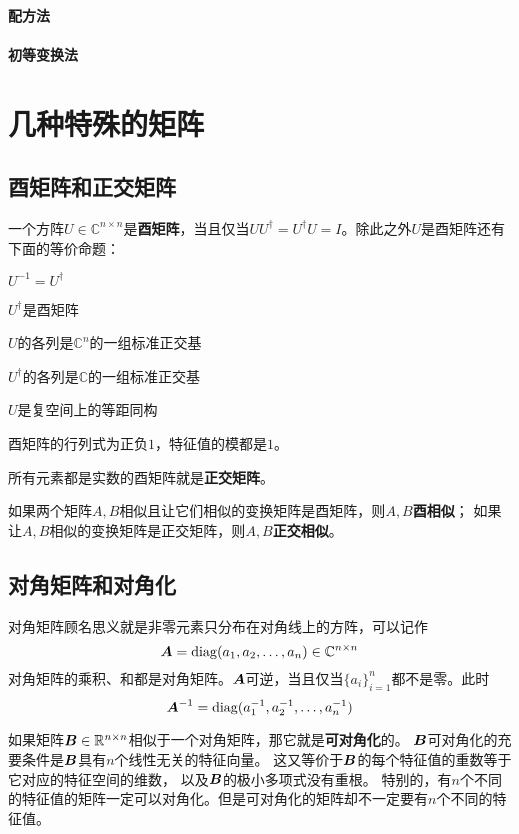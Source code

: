 \documentclass[UTF8]{ctexart}
\newcommand*{\reals}{\mathbb{R}}
\renewcommand*{\reals}{\mathbb{R}}
\newcommand*{\complexes}{\mathbb{C}}
\DeclareMathOperator{\diag}{diag}
\theoremstyle{definition}
\renewenvironment{itemize}{\begin{compactitem}}{\end{compactitem}}
\begin{document}
\paragraph{配方法}

\paragraph{初等变换法}

\section{几种特殊的矩阵}

\subsection{酉矩阵和正交矩阵}

一个方阵$U \in \complexes^{n\times n}$是\textbf{酉矩阵}，当且仅当$U U^\dagger = U^\dagger U = I$。除此之外$U$是酉矩阵还有下面的等价命题：
\begin{itemize}
    \item $U^{-1} = U^\dagger$
    \item $U^\dagger$是酉矩阵
    \item $U$的各列是$\complexes^n$的一组标准正交基
    \item $U^\dagger$的各列是$\complexes$的一组标准正交基
    \item $U$是复空间上的等距同构
\end{itemize}

酉矩阵的行列式为正负$1$，特征值的模都是$1$。

所有元素都是实数的酉矩阵就是\textbf{正交矩阵}。

如果两个矩阵$A, B$相似且让它们相似的变换矩阵是酉矩阵，则$A, B$\textbf{酉相似}；
如果让$A, B$相似的变换矩阵是正交矩阵，则$A, B$\textbf{正交相似}。

\subsection{对角矩阵和对角化}\label{sec:diag}

对角矩阵顾名思义就是非零元素只分布在对角线上的方阵，可以记作
\[
    \vb*{A} = \diag (a_1, a_2, \ldots, a_n) \in \complexes^{n\times n}
\]
对角矩阵的乘积、和都是对角矩阵。$\vb*{A}$可逆，当且仅当$\{a_i\}_{i=1}^n$都不是零。此时
\[
    \vb*{A}^{-1} = \diag (a_1^{-1}, a_2^{-1}, \ldots, a_n^{-1})
\]

如果矩阵$\vb*{B}\in \reals^{n \times n}$相似于一个对角矩阵，那它就是\textbf{可对角化}的。
$\vb*{B}$可对角化的充要条件是$\vb*{B}$具有$n$个线性无关的特征向量。
这又等价于$\vb*{B}$的每个特征值的重数等于它对应的特征空间的维数，
以及$\vb*{B}$的极小多项式没有重根。
特别的，有$n$个不同的特征值的矩阵一定可以对角化。但是可对角化的矩阵却不一定要有$n$个不同的特征值。
\end{document}
